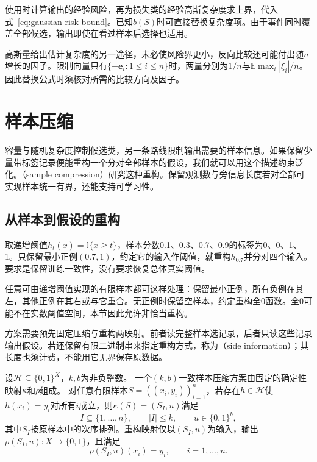 使用时计算输出的经验风险，再为损失类的经验高斯复杂度求上界，代入式~\eqref{eq:gaussian-risk-bound}。已知$b(S)$时可直接替换复杂度项。由于事件同时覆盖全部候选，输出即使在看过样本后选择也适用。

高斯量给出估计复杂度的另一途径，未必使风险界更小，反向比较还可能付出随$n$增长的因子。限制向量只有$\{\pm\bm e_i:1\leq i\leq n\}$时，两量分别为$1/n$与$\mathbb E\max_i|\xi_i|/n$。因此替换公式时须核对所需的比较方向及因子。

\section{样本压缩}
\label{sec:sample-compression}

容量与随机复杂度控制候选类，另一条路线限制输出需要的样本信息。如果保留少量带标签记录便能重构一个分对全部样本的假设，我们就可以用这个描述约束泛化。（sample compression）研究这种重构。保留观测数与旁信息长度若对全部可实现样本统一有界，还能支持可学习性。

\subsection{从样本到假设的重构}

取递增阈值$h_t(x)=\mathbb I\{x\geq t\}$，样本分数0.1、0.3、0.7、0.9的标签为0、0、1、1。只保留最小正例$(0.7,1)$，约定它的输入作阈值，就重构$h_{0.7}$并分对四个输入。要求是保留训练一致性，没有要求恢复总体真实阈值。

任意可由递增阈值实现的有限样本都可这样处理：保留最小正例，所有负例在其左，其他正例在其右或与它重合。无正例时保留空样本，约定重构全0函数。全0可能不在实数阈值空间，本节因此允许非恰当重构。

方案需要预先固定压缩与重构两映射。前者读完整样本选记录，后者只读这些记录输出假设。若还保留有限二进制串来指定重构方式，称为（side information）；其长度也须计费，不能用它无界保存原数据。

\begin{definition}[一致样本压缩方案]
\label{def:sample-compression}
设$\mathcal H\subseteq\{0,1\}^X$，$k,b$为非负整数。
一个$(k,b)$一致样本压缩方案由固定的确定性映射$\kappa$和$\rho$组成。
对任意有限样本$S=((x_i,y_i))_{i=1}^n$，若存在$h\in\mathcal H$使
$h(x_i)=y_i$对所有$i$成立，则$\kappa(S)=(S_I,u)$满足
\[
 I\subseteq\{1,\ldots,n\},\qquad |I|\leq k,\qquad u\in\{0,1\}^b,
\]
其中$S_I$按原样本中的次序排列。重构映射仅以$(S_I,u)$为输入，输出
$\rho(S_I,u):X\to\{0,1\}$，且满足
\[
 \rho(S_I,u)(x_i)=y_i,\qquad i=1,\ldots,n.
\]
\end{definition}

